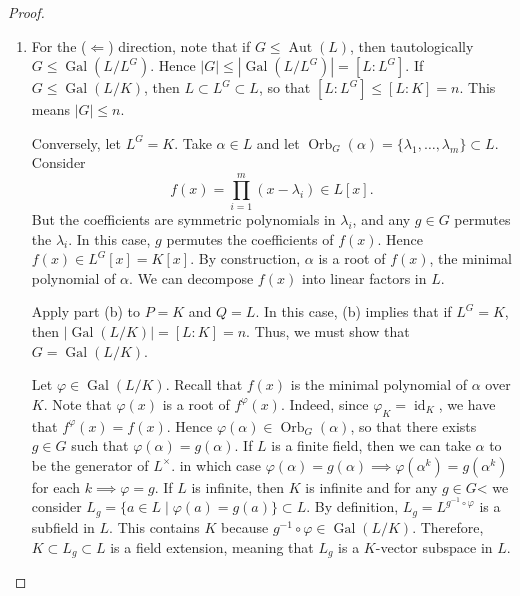 \documentclass[10pt,letterpaper,cm]{nupset}
\theoremstyle{definition}
\newcommand{\1}{\mathbf{1}}
\newcommand{\0}{\vec 0}
\DeclareMathOperator{\id}{id}
\DeclareMathOperator{\gal}{Gal}
\DeclareMathOperator{\aut}{Aut}
\DeclareMathOperator{\orb}{Orb}
\begin{document}
\begin{proof} $ $
\begin{enumerate}[label=(\alph*)]
\item For the ($\Longleftarrow$) direction, note that if $G \leq \aut(L)$, then tautologically $G \leq \gal(L/L^G)$. Hence $|G| \leq |\gal(L/L^G)| = [L: L^G]$. If $G \leq \gal(L/K)$, then $L \subset L^G \subset L$, so that $[L:L^G]\leq [L:K] =n$. This means $|G|\leq n$.

Conversely, let $L^G =K$.  Take $\alpha \in L$ and let $\orb_G(\alpha) = \{\lambda_1, \ldots, \lambda_m\} \subset L$. Consider $$f(x) = \prod_{i=1}^m (x-\lambda_i) \in L[x].$$ But the coefficients are symmetric polynomials in $\lambda_i$, and any $g\in G$ permutes the $\lambda_i$. In this case, $g$ permutes the coefficients of $f(x)$. Hence $f(x) \in L^G[x] = K[x]$. By construction, $\alpha$ is a root of $f(x)$, the minimal polynomial of $\alpha$.  We can decompose $f(x)$ into linear factors in $L$.

Apply part (b) to $P = K$ and $Q=L$. In this case, (b) implies that if $L^G=K$, then $\lvert{\gal(L/K)}\rvert = [L:K]=n$. Thus, we must show that $G = \gal(L/K)$.

Let $\varphi \in \gal(L/K)$. Recall that $f(x)$ is the minimal polynomial of $\alpha$ over $K$. Note that $\varphi(x)$ is a root of $f^{\varphi}(x)$. Indeed, since $\varphi_K = \id_K$, we have that $f^{\varphi}(x) = f(x)$. Hence $\varphi(\alpha) \in \orb_G(\alpha)$, so that there exists $g\in G$ such that $\varphi(\alpha) = g(\alpha)$. If $L$ is a finite field, then we can take $\alpha$ to be the generator of $L^{\times}$. in which case $\varphi(\alpha) = g(\alpha) \implies \varphi(\alpha^k)= g(\alpha^k)$ for each $k \implies \varphi = g.$ If $L$ is infinite, then $K$ is infinite and for any $g\in G$< we consider $L_g = \{a\in L \mid \varphi(a) = g(a)\}\subset L$. By definition, $L_g = L^{g^{-1}\circ \varphi}$ is a subfield in $L$. This contains $K$ because $g^{-1}\circ \varphi \in \gal(L/K)$. Therefore, $K\subset L_g \subset L$ is a field extension, meaning that $L_g$ is a $K$-vector subspace in $L$.


\end{enumerate}
\end{proof}
\end{document}
